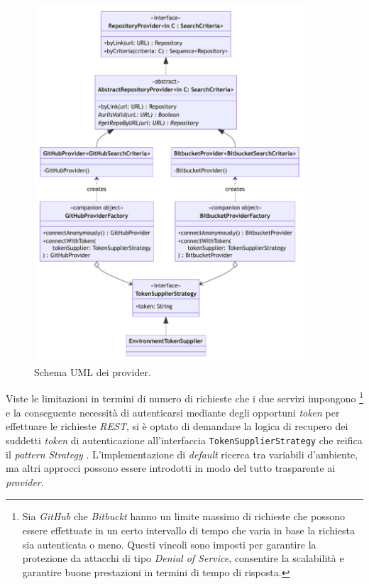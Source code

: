 \begin{figure}[h!]
    \centering
    \includegraphics[width=0.9\textwidth]{resources/img/02-provider.pdf}
    \caption{Schema UML dei provider.}
    \label{img:02-provider}
\end{figure}

Viste le limitazioni in termini di numero di richieste che i due servizi impongono \footnote{Sia \textit{GitHub} che \textit{Bitbuckt} hanno un limite massimo di richieste che possono essere effettuate in un certo intervallo di tempo che varia in base la richiesta sia autenticata o meno. Questi vincoli sono imposti per garantire la protezione da attacchi di tipo \textit{Denial of Service}, consentire la scalabilità e garantire buone prestazioni in termini di tempo di risposta.} e la conseguente necessità di autenticarsi mediante degli opportuni \textit{token} per effettuare le richieste \textit{REST}, si è optato di demandare la logica di recupero dei suddetti \textit{token} di autenticazione all'interfaccia \texttt{TokenSupplierStrategy} che reifica il \textit{pattern} \textit{Strategy} \cite{gof}.
%
L'implementazione di \textit{default} ricerca tra variabili d'ambiente, ma altri approcci possono essere introdotti in modo del tutto trasparente ai \textit{provider}.

